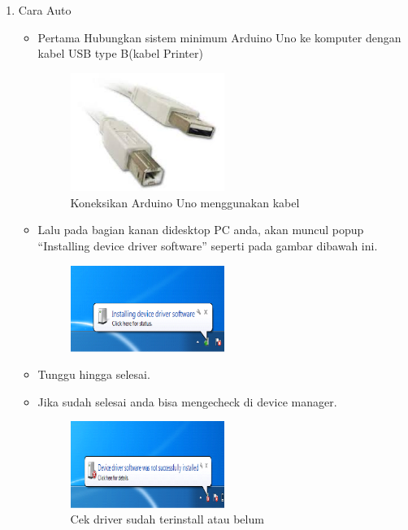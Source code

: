 \begin{enumerate}
\item Cara Auto
\begin{itemize}
\item Pertama Hubungkan sistem minimum Arduino Uno ke komputer dengan kabel USB type B(kabel Printer)
\begin{figure}[H] 
\includegraphics[width=5cm]{figures/5/Teori/1174025/no1.jpg}
\centering
\caption{Koneksikan Arduino Uno menggunakan kabel}
\end{figure}

\item Lalu pada bagian kanan didesktop PC anda, akan muncul popup “Installing device driver software” seperti pada gambar dibawah ini.
\begin{figure}[H] 
\includegraphics[width=5cm]{figures/5/Teori/1174025/no2.png}
\centering
\end{figure}

\item Tunggu hingga selesai.
\item Jika sudah selesai anda bisa mengecheck di device manager.
\begin{figure}[H] 
\includegraphics[width=5cm]{figures/5/Teori/1174025/no3.png}
\centering
\caption{Cek driver sudah terinstall atau belum}
\end{figure}
\end{itemize}


\end{enumerate}
